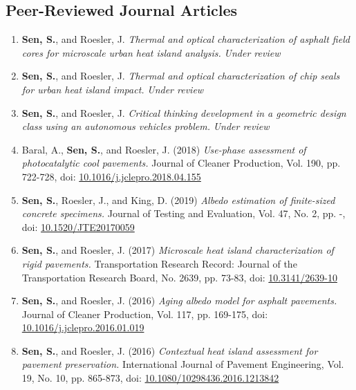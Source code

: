 \documentclass[12pt]{article}
\begin{document}
\subsection*{Peer-Reviewed Journal Articles}
\begin{enumerate}[label=(J\arabic*)]
	\item \textbf{Sen, S.}, and Roesler, J. \textit{Thermal and optical characterization of asphalt field cores for microscale urban heat island analysis.}  \textit{Under review}
	\item \textbf{Sen, S.}, and Roesler, J. \textit{Thermal and optical characterization of chip seals for urban heat island impact.}  \textit{Under review}
	\item \textbf{Sen, S.}, and Roesler, J. \textit{Critical thinking development in a geometric design class using an autonomous vehicles problem.}  \textit{Under review}
	\item Baral, A., \textbf{Sen, S.}, and Roesler, J. (2018) \textit{Use-phase assessment of photocatalytic cool pavements.}  Journal of Cleaner Production, Vol. 190, pp. 722-728, doi: \href{https://doi.org/10.1016/j.jclepro.2018.04.155}{10.1016/j.jclepro.2018.04.155}
	\item \textbf{Sen, S.}, Roesler, J., and King, D. (2019) \textit{Albedo estimation of finite-sized concrete specimens.} Journal of Testing and Evaluation, Vol. 47, No. 2, pp. -, doi: \href{https://doi.org/10.1520/JTE20170059}{10.1520/JTE20170059}
	\item \textbf{Sen, S.}, and Roesler, J. (2017) \textit{Microscale heat island characterization of rigid pavements.} Transportation Research Record: Journal of the Transportation Research Board, No. 2639, pp. 73-83, doi: \href{http://dx.doi.org/10.3141/2639-10}{10.3141/2639-10}
	\item \textbf{Sen, S.}, and Roesler, J. (2016) \textit{Aging albedo model for asphalt pavements.} Journal of Cleaner Production, Vol. 117, pp. 169-175, doi: \href{http://dx.doi.org/10.1016/j.jclepro.2016.01.019}{10.1016/j.jclepro.2016.01.019}
	\item \textbf{Sen, S.}, and Roesler, J. (2016) \textit{Contextual heat island assessment for pavement preservation.} International Journal of Pavement Engineering, Vol. 19, No. 10, pp. 865-873, doi: \href{https://www.tandfonline.com/doi/full/10.1080/10298436.2016.1213842}{10.1080/10298436.2016.1213842}
\end{enumerate}
\end{document}
